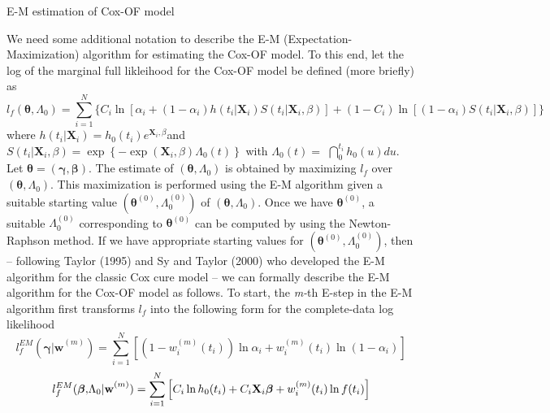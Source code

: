 \documentclass[a4paper, 12pt]{article}
\makeatletter
\renewcommand{\subsection}{\@startsection
{subsection}    {2}    {0mm}    {-0.5\baselineskip}    {0.01\baselineskip}    {\normalfont\normalsize\itshape\center}}
\makeatother
\begin{document}
\subsection{\protect\bigskip E-M estimation of Cox-OF model}

We need some additional notation to describe the E-M
(Expectation-Maximization) algorithm for estimating the Cox-OF model. To
this end, let the log of the marginal full likleihood for the Cox-OF model
be defined (more briefly) as%
\begin{equation}
l_{f}(\mathbf{\theta },\Lambda _{0})=\displaystyle\sum\limits_{i=1}^{N}%
\{C_{i}\ln [\alpha _{i}+(1-\alpha _{i})h(t_{i}|\mathbf{X}_{i})S(t_{i}|%
\mathbf{X}_{i}\mathbf{,}\beta )]+(1-C_{i})\ln [(1-\alpha _{i})S(t_{i}|%
\mathbf{X}_{i}\mathbf{,}\beta )]\}
\end{equation}%
where $h(t_{i}|\mathbf{X}_{i})=h_{0}(t_{i})e^{\mathbf{X}_{i}\mathbf{,}\beta
} $and $S(t_{i}|\mathbf{X}_{i}\mathbf{,}\beta )=\exp \left\{ -\exp (\mathbf{X%
}_{i}\mathbf{,}\beta )\Lambda _{0}(t)\right\} $ with $\Lambda _{0}(t)=$ $%
\dint\nolimits_{0}^{t_{i}}h_{0}(u)du$. Let $\mathbf{\theta }=(\mathbf{\gamma 
},\mathbf{\beta })$. The estimate of $(\mathbf{\theta },\Lambda _{0})$ is
obtained by maximizing $l_{f}$ over $(\mathbf{\theta },\Lambda _{0})$. This
maximization is performed using the E-M algorithm given a suitable starting
value $(\mathbf{\theta }^{(0)},\Lambda _{0}^{(0)})$ of $(\mathbf{\theta }%
,\Lambda _{0})$. Once we have $\mathbf{\theta }^{(0)}$, a suitable $\Lambda
_{0}^{(0)}$ corresponding to $\mathbf{\theta }^{(0)}$ can be computed by
using the Newton-Raphson method. If we have appropriate starting values for $%
(\mathbf{\theta }^{(0)},\Lambda _{0}^{(0)})$, then -- following Taylor
(1995) and Sy and Taylor (2000) who developed the E-M algorithm for the
classic Cox cure model -- we can formally describe the E-M algorithm for the
Cox-OF model as follows. To start, the \textit{m-}th E-step in the E-M
algorithm first transforms $l_{f}$ into the following form for the
complete-data log likelihood%
\begin{equation}
l_{f}^{EM}(\mathbf{\gamma |w}^{(m)})=\sum\limits_{i=1}^{N}\left[
(1-w_{i}^{(m)}(t_{i}))\ln \alpha _{i}+w_{i}^{(m)}(t_{i})\ln (1-\alpha _{i})%
\right]
\end{equation}%
\begin{equation}
l_{f}^{EM}(\mathbf{\beta ,}\Lambda _{0}\mathbf{|w}^{(m)})=\sum%
\limits_{i=1}^{N}\left[ C_{i}\ln h_{0}(t_{i})+C_{i}\mathbf{X}_{i}\mathbf{%
\beta }+w_{i}^{(m)}(t_{i})\ln f(t_{i})\right]
\end{equation}%
\end{document}
